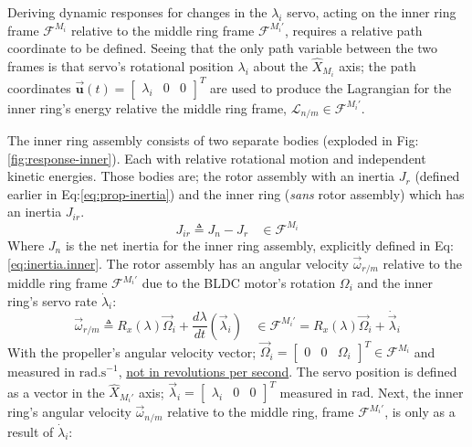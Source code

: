 \par
Deriving dynamic responses for changes in the $\lambda_i$ servo, acting on the inner ring frame $\mathcal{F}^{M_i}$ relative to the middle ring frame $\mathcal{F}^{M_i'}$, requires a relative path coordinate to be defined. Seeing that the only path variable between the two frames is that servo's rotational position $\lambda_i$ about the $\hat{X}_{M_i}$ axis; the path coordinates $\vec{\mathbf{u}}(t)=\begin{bmatrix}\lambda_i&0&0\end{bmatrix}^T$ are used to produce the Lagrangian for the inner ring's energy relative the middle ring frame, $\mathcal{L}_{n/m}\in\mathcal{F}^{M_i'}$.
\par
The inner ring assembly consists of two separate bodies (exploded in Fig:\ref{fig:response-inner}). Each with relative rotational motion and independent kinetic energies. Those bodies are; the rotor assembly with an inertia $J_{r}$ (defined earlier in Eq:\ref{eq:prop-inertia}) and the inner ring (\emph{sans} rotor assembly) which has an inertia $J_{ir}$.
\begin{equation}
J_{ir}\triangleq J_{n}-J_{r}~~~~\in\mathcal{F}^{M_i}
\end{equation} 
Where $J_n$ is the net inertia for the inner ring assembly, explicitly defined in Eq:\ref{eq:inertia.inner}. The rotor assembly has an angular velocity $\vec{\omega}_{r/m}$ relative to the middle ring frame $\mathcal{F}^{M_i'}$ due to the BLDC motor's rotation $\Omega_i$ and the inner ring's servo rate $\dot{\lambda}_i$:
\begin{subequations}\label{eq:angular-rot}
\begin{equation}
\vec{\omega}_{r/m}\triangleq R_x(\lambda)\vec{\Omega}_i+\frac{d\lambda}{dt}(\vec{\lambda}_i)~~~~\in\mathcal{F}^{M_i'}
\end{equation}
\begin{equation}
=R_x(\lambda)\vec{\Omega}_i+\dot{\vec{\lambda}}_i
\end{equation}
\end{subequations}
With the propeller's angular velocity vector; $\vec{\Omega}_i=\begin{bmatrix}0 & 0 & \Omega_i\end{bmatrix}^T\in\mathcal{F}^{M_i}$ and measured in $\text{rad.s}^{-1}$, \underline{not in revolutions per second}. The servo position is defined as a vector in the $\hat{X}_{M_i'}$ axis; $\vec{\lambda}_i=\begin{bmatrix}\lambda_i & 0 & 0\end{bmatrix}^T$ measured in $\text{rad}$. Next, the inner ring's angular velocity $\vec{\omega}_{n/m}$ relative to the middle ring, frame $\mathcal{F}^{M_i'}$, is only as a result of $\dot{\lambda}_i$:
